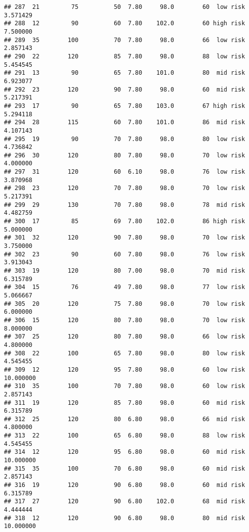 \documentclass[
  ignorenonframetext,
]{beamer}
\begin{document}
\begin{frame}[fragile]
\begin{verbatim}
## 287  21         75          50  7.80     98.0        60  low risk      3.571429
## 288  12         90          60  7.80    102.0        60 high risk      7.500000
## 289  35        100          70  7.80     98.0        66  low risk      2.857143
## 290  22        120          85  7.80     98.0        88  low risk      5.454545
## 291  13         90          65  7.80    101.0        80  mid risk      6.923077
## 292  23        120          90  7.80     98.0        60  mid risk      5.217391
## 293  17         90          65  7.80    103.0        67 high risk      5.294118
## 294  28        115          60  7.80    101.0        86  mid risk      4.107143
## 295  19         90          70  7.80     98.0        80  low risk      4.736842
## 296  30        120          80  7.80     98.0        70  low risk      4.000000
## 297  31        120          60  6.10     98.0        76  low risk      3.870968
## 298  23        120          70  7.80     98.0        70  low risk      5.217391
## 299  29        130          70  7.80     98.0        78  mid risk      4.482759
## 300  17         85          69  7.80    102.0        86 high risk      5.000000
## 301  32        120          90  7.80     98.0        70  low risk      3.750000
## 302  23         90          60  7.80     98.0        76  low risk      3.913043
## 303  19        120          80  7.00     98.0        70  mid risk      6.315789
## 304  15         76          49  7.80     98.0        77  low risk      5.066667
## 305  20        120          75  7.80     98.0        70  low risk      6.000000
## 306  15        120          80  7.80     98.0        70  low risk      8.000000
## 307  25        120          80  7.80     98.0        66  low risk      4.800000
## 308  22        100          65  7.80     98.0        80  low risk      4.545455
## 309  12        120          95  7.80     98.0        60  low risk     10.000000
## 310  35        100          70  7.80     98.0        60  low risk      2.857143
## 311  19        120          85  7.80     98.0        60  mid risk      6.315789
## 312  25        120          80  6.80     98.0        66  mid risk      4.800000
## 313  22        100          65  6.80     98.0        88  low risk      4.545455
## 314  12        120          95  6.80     98.0        60  mid risk     10.000000
## 315  35        100          70  6.80     98.0        60  mid risk      2.857143
## 316  19        120          90  6.80     98.0        60  mid risk      6.315789
## 317  27        120          90  6.80    102.0        68  mid risk      4.444444
## 318  12        120          90  6.80     98.0        80  mid risk     10.000000

\end{verbatim}
\end{frame}
\end{document}
